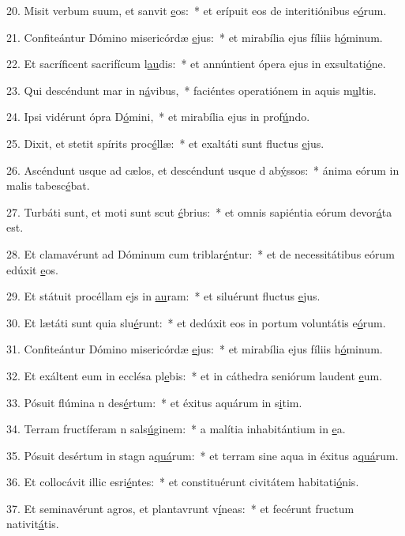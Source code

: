 20. Misit verbum suum, et sanvit \uline{e}os:~* et erípuit eos de interitiónibus e\uline{ó}rum.\par 
21. Confiteántur Dómino misericórdæ \uline{e}jus:~* et mirabília ejus fíliis h\uline{ó}minum.\par 
22. Et sacríficent sacrifícum l\uline{au}dis:~* et annúntient ópera ejus in exsultati\uline{ó}ne.\par 
23. Qui descéndunt mar in n\uline{á}vibus,~* faciéntes operatiónem in aquis m\uline{u}ltis.\par 
24. Ipsi vidérunt ópra D\uline{ó}mini,~* et mirabília ejus in prof\uline{ú}ndo.\par 
25. Dixit, et stetit spírits proc\uline{é}llæ:~* et exaltáti sunt fluctus \uline{e}jus.\par 
26. Ascéndunt usque ad cælos, et descéndunt usque d ab\uline{ý}ssos:~* ánima eórum in malis tabesc\uline{é}bat.\par 
27. Turbáti sunt, et moti sunt scut \uline{é}brius:~* et omnis sapiéntia eórum devor\uline{á}ta est.\par 
28. Et clamavérunt ad Dóminum cum triblar\uline{é}ntur:~* et de necessitátibus eórum edúxit \uline{e}os.\par 
29. Et státuit procéllam ejs in \uline{au}ram:~* et siluérunt fluctus \uline{e}jus.\par 
30. Et lætáti sunt quia slu\uline{é}runt:~* et dedúxit eos in portum voluntátis e\uline{ó}rum.\par 
31. Confiteántur Dómino misericórdæ \uline{e}jus:~* et mirabília ejus fíliis h\uline{ó}minum.\par 
32. Et exáltent eum in ecclésa pl\uline{e}bis:~* et in cáthedra seniórum laudent \uline{e}um.\par 
33. Pósuit flúmina n des\uline{é}rtum:~* et éxitus aquárum in s\uline{i}tim.\par 
34. Terram fructíferam n sals\uline{ú}ginem:~* a malítia inhabitántium in \uline{e}a.\par 
35. Pósuit desértum in stagn a\uline{quá}rum:~* et terram sine aqua in éxitus a\uline{quá}rum.\par 
36. Et collocávit illic esri\uline{é}ntes:~* et constituérunt civitátem habitati\uline{ó}nis.\par 
37. Et seminavérunt agros, et plantavrunt v\uline{í}neas:~* et fecérunt fructum nativit\uline{á}tis.\par 
